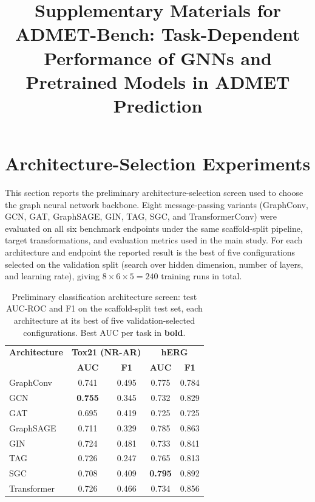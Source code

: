 \documentclass[journal,onecolumn]{IEEEtran}
\begin{document}
\title{Supplementary Materials for\\
ADMET-Bench: Task-Dependent Performance of GNNs and Pretrained Models in ADMET Prediction}

\author{}

\maketitle

\renewcommand{\thetable}{S\arabic{table}}
\renewcommand{\thefigure}{S\arabic{figure}}

\section{Architecture-Selection Experiments}
\label{sec:supp_architecture}

This section reports the preliminary architecture-selection screen used to choose the graph neural network backbone. Eight message-passing variants (GraphConv, GCN, GAT, GraphSAGE, GIN, TAG, SGC, and TransformerConv) were evaluated on all six benchmark endpoints under the same scaffold-split pipeline, target transformations, and evaluation metrics used in the main study. For each architecture and endpoint the reported result is the best of five configurations selected on the validation split (search over hidden dimension, number of layers, and learning rate), giving $8 \times 6 \times 5 = 240$ training runs in total.

\begin{table}[H]
\centering
\caption{Preliminary classification architecture screen: test AUC-ROC and F1 on the scaffold-split test set, each architecture at its best of five validation-selected configurations. Best AUC per task in \textbf{bold}.}
\label{tab:arch_classification}
\small
\setlength{\tabcolsep}{4pt}
\begin{tabular}{lcccc}
\toprule
\textbf{Architecture} & \multicolumn{2}{c}{\textbf{Tox21 (NR-AR)}} & \multicolumn{2}{c}{\textbf{hERG}} \\
 & \textbf{AUC} & \textbf{F1} & \textbf{AUC} & \textbf{F1} \\
\midrule
GraphConv & 0.741 & 0.495 & 0.775 & 0.784 \\
GCN & \textbf{0.755} & 0.345 & 0.732 & 0.829 \\
GAT & 0.695 & 0.419 & 0.725 & 0.725 \\
GraphSAGE & 0.711 & 0.329 & 0.785 & 0.863 \\
GIN & 0.724 & 0.481 & 0.733 & 0.841 \\
TAG & 0.726 & 0.247 & 0.765 & 0.813 \\
SGC & 0.708 & 0.409 & \textbf{0.795} & 0.892 \\
Transformer & 0.726 & 0.466 & 0.734 & 0.856 \\
\bottomrule
\end{tabular}
\end{table}
\end{document}
